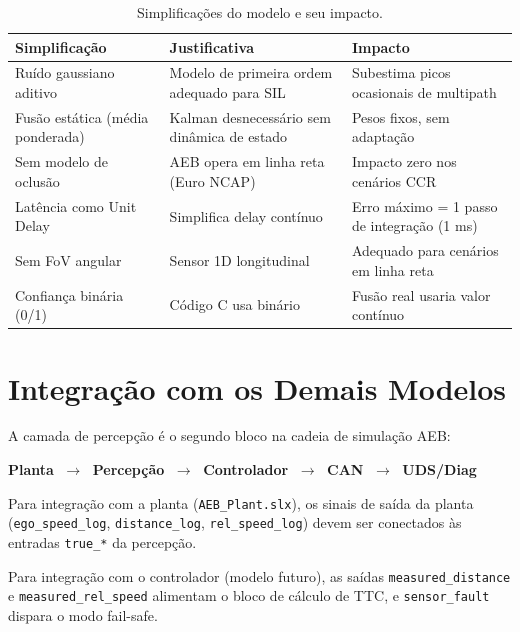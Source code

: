 \documentclass[12pt,a4paper]{article}
\begin{document}
\begin{table}[H]
\centering
\caption{Simplificações do modelo e seu impacto.}
\begin{tabularx}{\linewidth}{lXX}
\toprule
\rowcolor{azulescuro}
\color{white}\textbf{Simplifica\c{c}\~ao} &
\color{white}\textbf{Justificativa} &
\color{white}\textbf{Impacto} \\
\midrule
\rowcolor{azulclaro!40}
Ru\'ido gaussiano aditivo & Modelo de primeira ordem adequado para SIL & Subestima picos ocasionais de multipath \\
Fus\~ao est\'atica (m\'edia ponderada) & Kalman desnecessário sem din\^amica de estado & Pesos fixos, sem adapta\c{c}\~ao \\
\rowcolor{azulclaro!40}
Sem modelo de oclusão & AEB opera em linha reta (Euro NCAP) & Impacto zero nos cen\'arios CCR \\
Lat\^encia como Unit Delay & Simplifica delay cont\'inuo & Erro m\'aximo = 1 passo de integra\c{c}\~ao (1 ms) \\
\rowcolor{azulclaro!40}
Sem FoV angular & Sensor 1D longitudinal & Adequado para cen\'arios em linha reta \\
Confian\c{c}a bin\'aria (0/1) & C\'odigo C usa bin\'ario & Fus\~ao real usaria valor cont\'inuo \\
\bottomrule
\end{tabularx}
\end{table}

\section{Integra\c{c}\~ao com os Demais Modelos}

A camada de percep\c{c}\~ao \'e o segundo bloco na cadeia de simula\c{c}\~ao AEB:

\begin{center}
\textbf{Planta} $\;\to\;$ \textbf{Percep\c{c}\~ao} $\;\to\;$ \textbf{Controlador} $\;\to\;$ \textbf{CAN} $\;\to\;$ \textbf{UDS/Diag}
\end{center}

Para integra\c{c}\~ao com a planta (\texttt{AEB\_Plant.slx}), os sinais de sa\'ida
da planta (\texttt{ego\_speed\_log}, \texttt{distance\_log}, \texttt{rel\_speed\_log})
devem ser conectados \`as entradas \texttt{true\_*} da percep\c{c}\~ao.

Para integra\c{c}\~ao com o controlador (modelo futuro), as sa\'idas
\texttt{measured\_distance} e \texttt{measured\_rel\_speed} alimentam o bloco
de c\'alculo de TTC, e \texttt{sensor\_fault} dispara o modo fail-safe.
\end{document}
